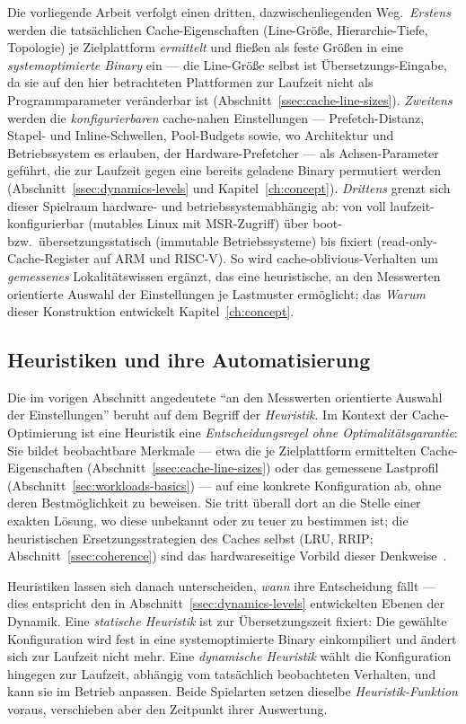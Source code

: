 Die vorliegende Arbeit verfolgt einen dritten, dazwischenliegenden Weg.\ \emph{Erstens} werden die
tatsächlichen Cache-Eigenschaften (Line-Größe, Hierarchie-Tiefe, Topologie) je Zielplattform
\emph{ermittelt} und fließen als feste Größen in eine \emph{systemoptimierte Binary} ein --- die
Line-Größe selbst ist Übersetzungs-Eingabe, da sie auf den hier betrachteten Plattformen zur
Laufzeit nicht als Programmparameter veränderbar ist (Abschnitt~\ref{ssec:cache-line-sizes}).
\emph{Zweitens} werden die \emph{konfigurierbaren} cache-nahen Einstellungen --- Prefetch-Distanz,
Stapel- und Inline-Schwellen, Pool-Budgets sowie, wo Architektur und Betriebssystem es erlauben, der
Hardware-Prefetcher --- als Achsen-Parameter geführt, die zur Laufzeit gegen eine bereits geladene
Binary permutiert werden (Abschnitt~\ref{ssec:dynamics-levels} und Kapitel~\ref{ch:concept}).
\emph{Drittens} grenzt sich dieser Spielraum hardware- und betriebssystemabhängig ab: von voll
laufzeit-konfigurierbar (mutables Linux mit MSR-Zugriff) über boot- bzw.\ übersetzungsstatisch
(immutable Betriebssysteme) bis fixiert (read-only-Cache-Register auf ARM und RISC-V). So wird
cache-oblivious-Verhalten um \emph{gemessenes} Lokalitätswissen ergänzt, das eine heuristische, an
den Messwerten orientierte Auswahl der Einstellungen je Lastmuster ermöglicht; das \emph{Warum}
dieser Konstruktion entwickelt Kapitel~\ref{ch:concept}.

\subsection{Heuristiken und ihre Automatisierung}\label{ssec:heuristics}
Die im vorigen Abschnitt angedeutete
\enquote{an den Messwerten orientierte Auswahl der Einstellungen} beruht auf dem Begriff der
\emph{Heuristik}. Im Kontext der Cache-Optimierung ist eine Heuristik eine
\emph{Entscheidungsregel ohne Optimalitätsgarantie}: Sie bildet beobachtbare Merkmale --- etwa die
je Zielplattform ermittelten Cache-Eigenschaften (Abschnitt~\ref{ssec:cache-line-sizes}) oder das
gemessene Lastprofil (Abschnitt~\ref{sec:workloads-basics}) --- auf eine konkrete Konfiguration ab,
ohne deren Bestmöglichkeit zu beweisen. Sie tritt überall dort an die Stelle einer exakten Lösung,
wo diese unbekannt oder zu teuer zu bestimmen ist; die heuristischen Ersetzungsstrategien des Caches
selbst (LRU, RRIP\@; Abschnitt~\ref{ssec:coherence}) sind das hardwareseitige Vorbild dieser
Denkweise~\cite{jaleel2010rrip}.

Heuristiken lassen sich danach unterscheiden, \emph{wann} ihre Entscheidung fällt --- dies
entspricht den in Abschnitt~\ref{ssec:dynamics-levels} entwickelten Ebenen der Dynamik. Eine
\emph{statische Heuristik} ist zur Übersetzungszeit fixiert: Die gewählte Konfiguration wird fest in
eine systemoptimierte Binary einkompiliert und ändert sich zur Laufzeit nicht mehr. Eine
\emph{dynamische Heuristik} wählt die Konfiguration hingegen zur Laufzeit, abhängig vom tatsächlich
beobachteten Verhalten, und kann sie im Betrieb anpassen. Beide Spielarten setzen dieselbe
\emph{Heuristik-Funktion} voraus, verschieben aber den Zeitpunkt ihrer Auswertung.

